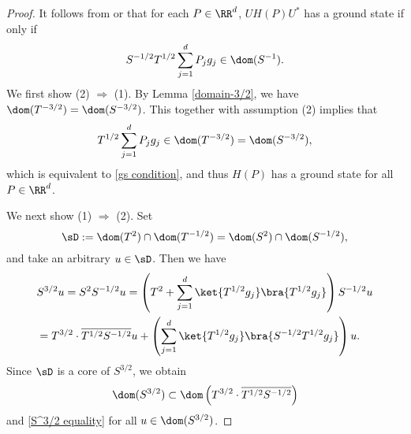 \documentclass[12pt,draft]{article}
\theoremstyle{plain}
\numberwithin{equation}{section}
\theoremstyle{remark}
\begin{document}
\begin{proof}
It follows from \cite[Proposition 3.13]{De03} or \cite[Theorem 11.73 (3)]{DG13} that for each $P\in\RR^d$, $UH(P)U^{*}$ has a ground state if only if 
\begin{equation}\label{gs condition}
S^{-1/2}T^{1/2}\sum_{j=1}^{d} P_jg_j\in\dom(S^{-1}).
\end{equation}
We first show (2) $\Rightarrow$ (1).
By Lemma \ref{domain-3/2}, we have $\dom(T^{-3/2})=\dom(S^{-3/2})$.
This together with assumption (2) implies that
\[
T^{1/2}\sum_{j=1}^{d} P_jg_j\in\dom(T^{-3/2})=\dom(S^{-3/2}),
\]
which is equivalent to \eqref{gs condition}, and thus $H(P)$ has a ground state for all $P\in\RR^d$.

We next show (1) $\Rightarrow$ (2).
Set
\[
\sD :=\dom(T^2)\cap\dom(T^{-1/2})=\dom(S^2)\cap\dom(S^{-1/2}),
\]
and take an arbitrary $u\in\sD $.
Then we have
\begin{align}\label{S^3/2 equality}
&S^{3/2}u = S^2S^{-1/2}u = \left(T^2+\sum_{j=1}^d\ket{T^{1/2}g_j}\bra{T^{1/2}g_j}\right)S^{-1/2}u\notag\\
&= T^{3/2}\cdot\overline{T^{1/2}S^{-1/2}}u+\left(\sum_{j=1}^d\ket{T^{1/2}g_j}\bra{S^{-1/2}T^{1/2}g_j}\right)u.
\end{align}
Since $\sD $ is a core of $S^{3/2}$, we obtain 
\[
\dom(S^{3/2})\subset\dom\left(T^{3/2}\cdot\overline{T^{1/2}S^{-1/2}}\right)
\]
and \eqref{S^3/2 equality} for all $u\in\dom(S^{3/2})$.


\end{proof}
\end{document}
